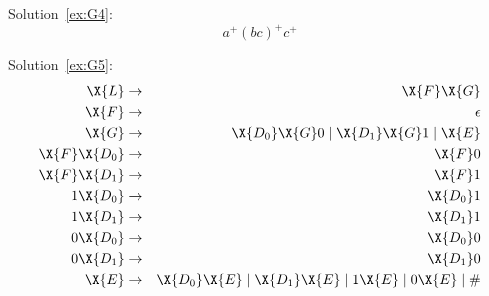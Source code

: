 \noindent Solution~\ref{ex:G4}:\\
$$a^+(bc)^+c^+$$

\noindent Solution~\ref{ex:G5}:\\
\begin{eqnarray*}
  \X{L}  & \rightarrow & \X{F}\X{G} \\
  \X{F}  & \rightarrow & \epsilon \\
  \X{G}  & \rightarrow & \X{D_0}\X{G}0 \mid \X{D_1}\X{G}1 \mid \X{E} \\
  \X{F}\X{D_0} & \rightarrow & \X{F}0 \\
  \X{F}\X{D_1} & \rightarrow & \X{F}1 \\
  1\X{D_0}  & \rightarrow & \X{D_0}1 \\
  1\X{D_1}  & \rightarrow & \X{D_1}1 \\
  0\X{D_0}  & \rightarrow & \X{D_0}0 \\
  0\X{D_1}  & \rightarrow & \X{D_1}0 \\
  \X{E}  & \rightarrow & \X{D_0}\X{E} \mid \X{D_1}\X{E} \mid 1\X{E} \mid
0\X{E} \mid \# \\
\end{eqnarray*}

\fi %
